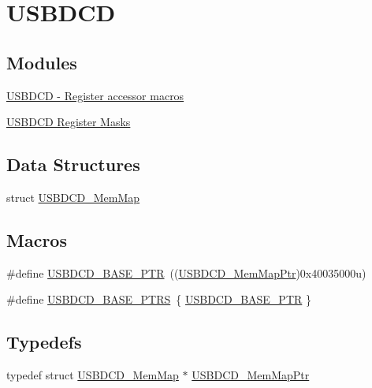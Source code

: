 \hypertarget{group___u_s_b_d_c_d___peripheral}{}\section{U\+S\+B\+D\+C\+D}
\label{group___u_s_b_d_c_d___peripheral}
\subsection*{Modules}
\begin{DoxyCompactItemize}
\item 
\hyperlink{group___u_s_b_d_c_d___register___accessor___macros}{U\+S\+B\+D\+C\+D -\/ Register accessor macros}
\item 
\hyperlink{group___u_s_b_d_c_d___register___masks}{U\+S\+B\+D\+C\+D Register Masks}
\end{DoxyCompactItemize}
\subsection*{Data Structures}
\begin{DoxyCompactItemize}
\item 
struct \hyperlink{struct_u_s_b_d_c_d___mem_map}{U\+S\+B\+D\+C\+D\+\_\+\+Mem\+Map}
\end{DoxyCompactItemize}
\subsection*{Macros}
\begin{DoxyCompactItemize}
\item 
\#define \hyperlink{group___u_s_b_d_c_d___peripheral_ga6289dc687e9b991508629237aeb61755}{U\+S\+B\+D\+C\+D\+\_\+\+B\+A\+S\+E\+\_\+\+P\+T\+R}~((\hyperlink{group___u_s_b_d_c_d___peripheral_gad6e68bd3ca7f14168c34ff5e824dd321}{U\+S\+B\+D\+C\+D\+\_\+\+Mem\+Map\+Ptr})0x40035000u)
\item 
\#define \hyperlink{group___u_s_b_d_c_d___peripheral_ga343ff2427307e24846cef614df7cea8a}{U\+S\+B\+D\+C\+D\+\_\+\+B\+A\+S\+E\+\_\+\+P\+T\+R\+S}~\{ \hyperlink{group___u_s_b_d_c_d___peripheral_ga6289dc687e9b991508629237aeb61755}{U\+S\+B\+D\+C\+D\+\_\+\+B\+A\+S\+E\+\_\+\+P\+T\+R} \}
\end{DoxyCompactItemize}
\subsection*{Typedefs}
\begin{DoxyCompactItemize}
\item 
typedef struct \hyperlink{struct_u_s_b_d_c_d___mem_map}{U\+S\+B\+D\+C\+D\+\_\+\+Mem\+Map} $\ast$ \hyperlink{group___u_s_b_d_c_d___peripheral_gad6e68bd3ca7f14168c34ff5e824dd321}{U\+S\+B\+D\+C\+D\+\_\+\+Mem\+Map\+Ptr}
\end{DoxyCompactItemize}


